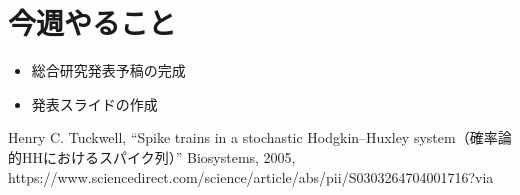 \documentclass[dvipdfmx, A4j, twocolumn, 10.5pt]{jsarticle}
\begin{document}
\fi

\section{今週やること}
\begin{itemize}
 \item 総合研究発表予稿の完成
 \item 発表スライドの作成
\end{itemize}




\begin{thebibliography}{99}
 Henry C. Tuckwell, ``Spike trains in a stochastic Hodgkin–Huxley system（確率論的HHにおけるスパイク列）'' Biosystems, 2005, https://www.sciencedirect.com/science/article/abs/pii/S0303264704001716?via%
\end{thebibliography}
\end{document}
